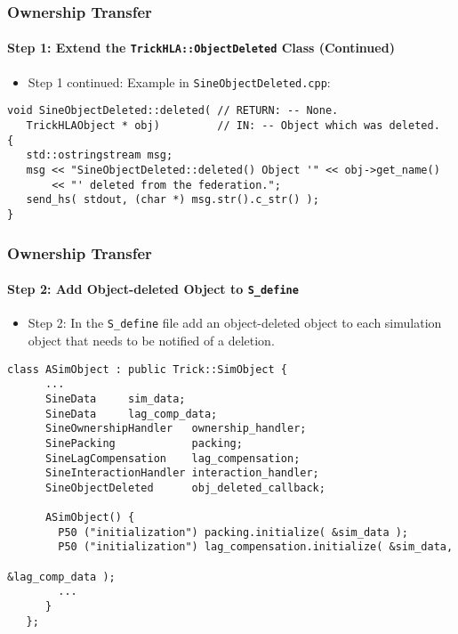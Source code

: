    \begin{frame}[fragile]
      \frametitle{Ownership Transfer}
      \framesubtitle{Step 1: Extend the \texttt{TrickHLA::ObjectDeleted} Class (Continued)}
      \begin{itemize}
         \item Step 1 continued: Example in \texttt{SineObjectDeleted.cpp}:
      \end{itemize}
\begin{Verbatim}[frame=single, fontsize=\scriptsize]
void SineObjectDeleted::deleted( // RETURN: -- None.
   TrickHLAObject * obj)         // IN: -- Object which was deleted.
{
   std::ostringstream msg;
   msg << "SineObjectDeleted::deleted() Object '" << obj->get_name()
       << "' deleted from the federation.";
   send_hs( stdout, (char *) msg.str().c_str() );
}
\end{Verbatim}
   \end{frame}

   \begin{frame}[fragile]
      \frametitle{Ownership Transfer}
      \framesubtitle{Step 2: Add Object-deleted Object to \texttt{S\_define}}
      \begin{itemize}
         \item Step 2: In the \texttt{S\_define} file add an object-deleted
         object to each simulation object that needs to be notified of a deletion.
      \end{itemize}
\begin{Verbatim}[frame=single, fontsize=\scriptsize]
   class ASimObject : public Trick::SimObject {
      ...
      SineData     sim_data;
      SineData     lag_comp_data;
      SineOwnershipHandler   ownership_handler;
      SinePacking            packing;
      SineLagCompensation    lag_compensation;
      SineInteractionHandler interaction_handler;
      SineObjectDeleted      obj_deleted_callback;

      ASimObject() {
        P50 ("initialization") packing.initialize( &sim_data );
        P50 ("initialization") lag_compensation.initialize( &sim_data, 
                                                            &lag_comp_data );
        ...
      }
   };
\end{Verbatim}
   \end{frame}

